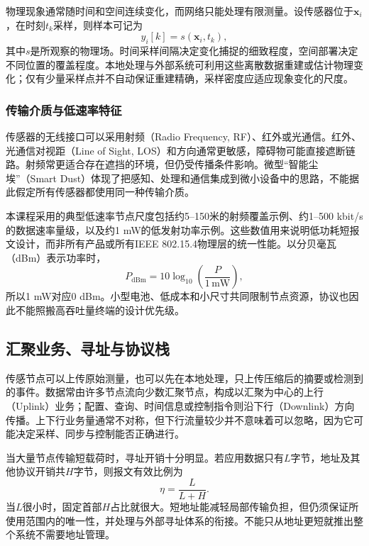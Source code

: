 物理现象通常随时间和空间连续变化，而网络只能处理有限测量。设传感器位于$\boldsymbol{x}_i$，在时刻$t_k$采样，则样本可记为
\begin{equation}
 y_i[k]=s(\boldsymbol{x}_i,t_k),
\end{equation}
其中$s$是所观察的物理场。时间采样间隔决定变化捕捉的细致程度，空间部署决定不同位置的覆盖程度。本地处理与外部系统可利用这些离散数据重建或估计物理变化；仅有少量采样点并不自动保证重建精确，采样密度应适应现象变化的尺度。

\subsubsection{传输介质与低速率特征}

传感器的无线接口可以采用射频（Radio Frequency, RF）、红外或光通信。红外、光通信对视距（Line of Sight, LOS）和方向通常更敏感，障碍物可能直接遮断链路。射频常更适合存在遮挡的环境，但仍受传播条件影响。微型“智能尘埃”（Smart Dust）体现了把感知、处理和通信集成到微小设备中的思路，不能据此假定所有传感器都使用同一种传输介质。

本课程采用的典型低速率节点尺度包括约5--150米的射频覆盖示例、约1--500 kbit/s的数据速率量级，以及约1 mW的低发射功率示例。这些数值用来说明低功耗短报文设计，而非所有产品或所有IEEE 802.15.4物理层的统一性能。以分贝毫瓦（dBm）表示功率时，
\begin{equation}
 P_{\mathrm{dBm}}=10\log_{10}\left(\frac{P}{1\,\mathrm{mW}}\right),
\end{equation}
所以1 mW对应0 dBm。小型电池、低成本和小尺寸共同限制节点资源，协议也因此不能照搬高吞吐量终端的设计优先级。

\subsection{汇聚业务、寻址与协议栈}

传感节点可以上传原始测量，也可以先在本地处理，只上传压缩后的摘要或检测到的事件。数据常由许多节点流向少数汇聚节点，构成以汇聚为中心的上行（Uplink）业务；配置、查询、时间信息或控制指令则沿下行（Downlink）方向传播。上下行业务量通常不对称，但下行流量较少并不意味着可以忽略，因为它可能决定采样、同步与控制能否正确进行。

当大量节点传输短载荷时，寻址开销十分明显。若应用数据只有$L$字节，地址及其他协议开销共$H$字节，则报文有效比例为
\begin{equation}
 \eta=\frac{L}{L+H}.
\end{equation}
当$L$很小时，固定首部$H$占比就很大。短地址能减轻局部传输负担，但仍须保证所使用范围内的唯一性，并处理与外部寻址体系的衔接。不能只从地址更短就推出整个系统不需要地址管理。

